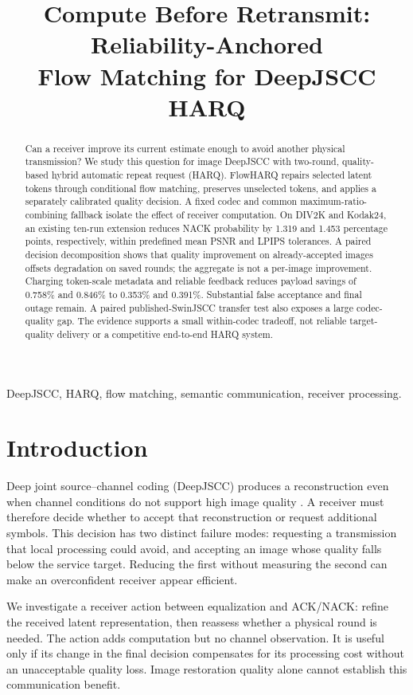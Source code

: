 \documentclass[conference]{IEEEtran}
\title{Compute Before Retransmit: Reliability-Anchored\\Flow Matching for DeepJSCC HARQ}
\author{\IEEEauthorblockN{Anonymous Authors}\IEEEauthorblockA{Author information withheld in this draft}}
\begin{document}
\maketitle
\begin{abstract}
Can a receiver improve its current estimate enough to avoid another physical
transmission? We study this question for image DeepJSCC with two-round,
quality-based hybrid automatic repeat request (HARQ). FlowHARQ repairs selected
latent tokens through conditional flow matching, preserves unselected tokens,
and applies a separately calibrated quality decision. A fixed codec and common
maximum-ratio-combining fallback isolate the effect of receiver computation.
On DIV2K and Kodak24, an existing ten-run extension reduces NACK probability
by 1.319 and 1.453 percentage points, respectively, within predefined mean
PSNR and LPIPS tolerances. A paired decision decomposition shows that quality
improvement on already-accepted images offsets degradation on saved rounds;
the aggregate is not a per-image improvement. Charging token-scale metadata
and reliable feedback reduces payload savings of 0.758\% and 0.846\% to
0.353\% and 0.391\%. Substantial false acceptance and final outage remain.
A paired published-SwinJSCC transfer test also exposes a large codec-quality
gap. The evidence supports a small within-codec tradeoff, not reliable
target-quality delivery or a competitive end-to-end HARQ system.
\end{abstract}
\begin{IEEEkeywords}
DeepJSCC, HARQ, flow matching, semantic communication, receiver processing.
\end{IEEEkeywords}

\section{Introduction}
Deep joint source--channel coding (DeepJSCC) produces a reconstruction even
when channel conditions do not support high image quality \cite{deepjscc}.
A receiver must therefore decide whether to accept that reconstruction or
request additional symbols. This decision has two distinct failure modes:
requesting a transmission that local processing could avoid, and accepting an
image whose quality falls below the service target. Reducing the first without
measuring the second can make an overconfident receiver appear efficient.

We investigate a receiver action between equalization and ACK/NACK: refine
the received latent representation, then reassess whether a physical round is
needed. The action adds computation but no channel observation. It is useful
only if its change in the final decision compensates for its processing cost
without an unacceptable quality loss. Image restoration quality alone cannot
establish this communication benefit.
\end{document}
